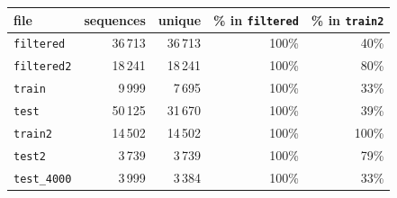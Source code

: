 \begin{tabular}{lrrrr}
\toprule
file & sequences & unique & \% in \texttt{filtered} & \% in \texttt{train2} \\
\midrule
\texttt{filtered} & 36\,713 & 36\,713 & 100\% & 40\% \\
\texttt{filtered2} & 18\,241 & 18\,241 & 100\% & 80\% \\
\texttt{train} & 9\,999 & 7\,695 & 100\% & 33\% \\
\texttt{test} & 50\,125 & 31\,670 & 100\% & 39\% \\
\texttt{train2} & 14\,502 & 14\,502 & 100\% & 100\% \\
\texttt{test2} & 3\,739 & 3\,739 & 100\% & 79\% \\
\texttt{test\_4000} & 3\,999 & 3\,384 & 100\% & 33\% \\
\bottomrule
\end{tabular}